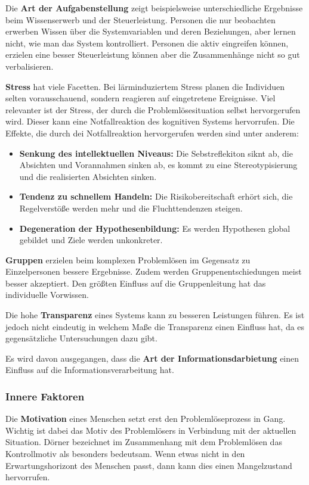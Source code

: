 Die \textbf{Art der Aufgabenstellung} zeigt beispielsweise unterschiedliche Ergebnisse beim Wissenserwerb und der Steuerleistung. Personen die nur beobachten erwerben Wissen über die Systemvariablen und deren Beziehungen, aber lernen nicht, wie man das System kontrolliert. Personen die aktiv eingreifen können, erzielen eine besser Steuerleistung können aber die Zusammenhänge nicht so gut verbalisieren.

\textbf{Stress} hat viele Facetten. Bei lärminduziertem Stress planen die Individuen selten vorausschauend, sondern reagieren auf eingetretene Ereignisse. Viel relevanter ist der Stress, der durch die Problemlösesituation selbst hervorgerufen wird. Dieser kann eine Notfallreaktion des kognitiven Systems hervorrufen. Die Effekte, die durch dei Notfallreaktion hervorgerufen werden sind unter anderem:
\begin{itemize}
\item \textbf{Senkung des intellektuellen Niveaus:} Die Sebstreflekiton siknt ab, die Absichten und Vorannahmen sinken ab, es kommt zu eine Stereotypisierung und die realisierten Absichten sinken.
\item \textbf{Tendenz zu schnellem Handeln:} Die Risikobereitschaft erhört sich, die Regelverstöße werden mehr und die Fluchttendenzen steigen.
\item \textbf{Degeneration der Hypothesenbildung:} Es werden Hypothesen global gebildet und Ziele werden unkonkreter.
\end{itemize}

\textbf{Gruppen} erzielen beim komplexen Problemlösen im Gegensatz zu Einzelpersonen bessere Ergebnisse. Zudem werden Gruppenentschiedungen meist besser akzeptiert. Den größten Einfluss auf die Gruppenleitung hat das individuelle Vorwissen.

Die hohe \textbf{Transparenz} eines Systems kann zu besseren Leistungen führen. Es ist jedoch nicht eindeutig in welchem Maße die Transparenz einen Einfluss hat, da es gegensätzliche Untersuchungen dazu gibt.

Es wird davon ausgegangen, dass die \textbf{Art der Informationsdarbietung} einen Einfluss auf die Informationsverarbeitung hat.

\subsubsection*{Innere Faktoren}
Die \textbf{Motivation} eines Menschen setzt erst den Problemlöseprozess in Gang. \cite{Dorner1984} Wichtig ist dabei das Motiv des Problemlösers in Verbindung mit der aktuellen Situation. Dörner bezeichnet im Zusammenhang mit dem Problemlösen das Kontrollmotiv als besonders bedeutsam. Wenn etwas nicht in den Erwartungshorizont des Menschen passt, dann kann dies einen Mangelzustand hervorrufen. 

